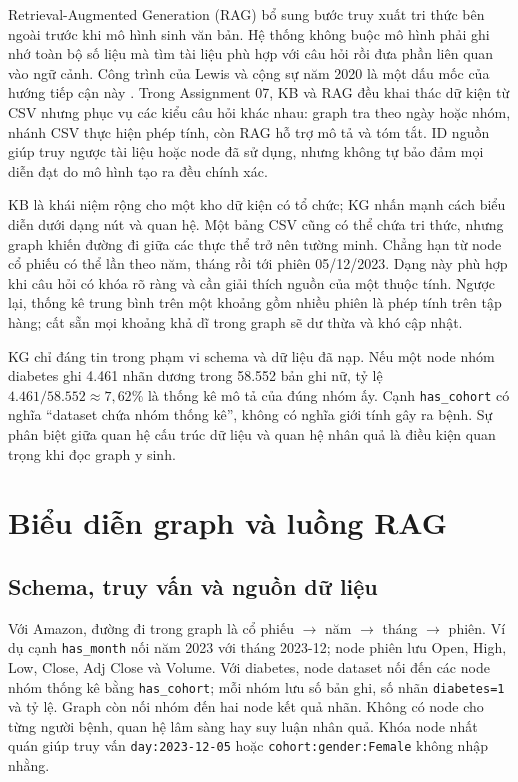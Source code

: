 \documentclass[12pt,a4paper]{report}
\begin{document}
Retrieval-Augmented Generation (RAG) bổ sung bước truy xuất tri thức bên ngoài trước khi mô hình sinh văn bản. Hệ thống không buộc mô hình phải ghi nhớ toàn bộ số liệu mà tìm tài liệu phù hợp với câu hỏi rồi đưa phần liên quan vào ngữ cảnh. Công trình của Lewis và cộng sự năm 2020 là một dấu mốc của hướng tiếp cận này \cite{essay03-lewis}. Trong Assignment 07, KB và RAG đều khai thác dữ kiện từ CSV nhưng phục vụ các kiểu câu hỏi khác nhau: graph tra theo ngày hoặc nhóm, nhánh CSV thực hiện phép tính, còn RAG hỗ trợ mô tả và tóm tắt. ID nguồn giúp truy ngược tài liệu hoặc node đã sử dụng, nhưng không tự bảo đảm mọi diễn đạt do mô hình tạo ra đều chính xác.

KB là khái niệm rộng cho một kho dữ kiện có tổ chức; KG nhấn mạnh cách biểu diễn dưới dạng nút và quan hệ. Một bảng CSV cũng có thể chứa tri thức, nhưng graph khiến đường đi giữa các thực thể trở nên tường minh. Chẳng hạn từ node cổ phiếu có thể lần theo năm, tháng rồi tới phiên 05/12/2023. Dạng này phù hợp khi câu hỏi có khóa rõ ràng và cần giải thích nguồn của một thuộc tính. Ngược lại, thống kê trung bình trên một khoảng gồm nhiều phiên là phép tính trên tập hàng; cất sẵn mọi khoảng khả dĩ trong graph sẽ dư thừa và khó cập nhật.

KG chỉ đáng tin trong phạm vi schema và dữ liệu đã nạp. Nếu một node nhóm diabetes ghi 4.461 nhãn dương trong 58.552 bản ghi nữ, tỷ lệ $4.461/58.552\approx7{,}62\%$ là thống kê mô tả của đúng nhóm ấy. Cạnh \texttt{has\_cohort} có nghĩa ``dataset chứa nhóm thống kê'', không có nghĩa giới tính gây ra bệnh. Sự phân biệt giữa quan hệ cấu trúc dữ liệu và quan hệ nhân quả là điều kiện quan trọng khi đọc graph y sinh.

\section{Biểu diễn graph và luồng RAG}
\subsection{Schema, truy vấn và nguồn dữ liệu}
Với Amazon, đường đi trong graph là cổ phiếu $\rightarrow$ năm $\rightarrow$ tháng
$\rightarrow$ phiên. Ví dụ cạnh \texttt{has\_month} nối năm 2023 với tháng 2023-12;
node phiên lưu Open, High, Low, Close, Adj Close và Volume. Với diabetes, node dataset nối đến
các node nhóm thống kê bằng \texttt{has\_cohort}; mỗi nhóm lưu số bản ghi, số nhãn
\texttt{diabetes=1} và tỷ lệ. Graph còn nối nhóm đến hai node kết quả nhãn. Không có node cho
từng người bệnh, quan hệ lâm sàng hay suy luận nhân quả. Khóa node nhất quán giúp truy vấn
\texttt{day:2023-12-05} hoặc \texttt{cohort:gender:Female} không nhập nhằng.
\end{document}

